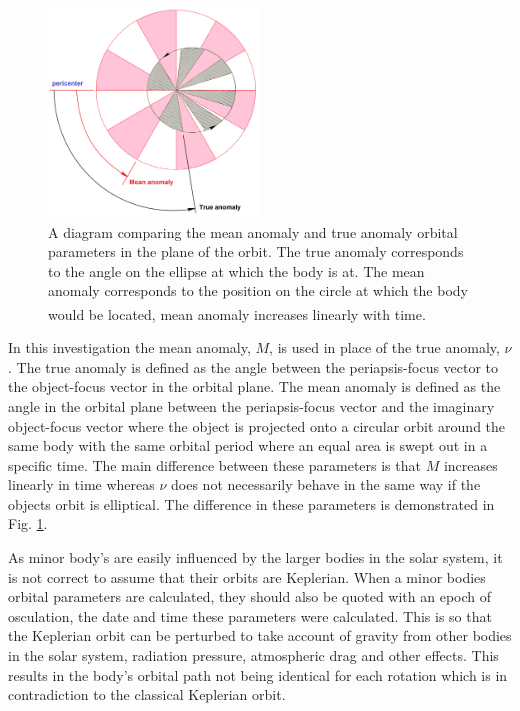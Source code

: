 \documentclass[10pt, twocolumn]{revtex4}    %
\newcommand{\scite}[1]{\textsuperscript{\cite{#1}}}
\begin{document}
\begin{figure}[h!]
\centering
\includegraphics[width=0.5\textwidth]{Mean_anomaly_diagram.png}
\caption{A diagram comparing the mean anomaly and true anomaly orbital parameters in the plane of the orbit. The true anomaly corresponds to the angle on the ellipse at which the body is at. The mean anomaly corresponds to the position on the circle at which the body would be located, mean anomaly increases linearly with time.\scite{Meananomalydiagram2015}}
\label{fig: mean-true anom}
\end{figure}

In this investigation the mean anomaly, $M$, is used in place of the true anomaly, $\nu$. The true anomaly is defined as the angle between the periapsis-focus vector to the object-focus vector in the orbital plane. The mean anomaly is defined as the angle in the orbital plane between the periapsis-focus vector and the imaginary object-focus vector where the object is projected onto a circular orbit around the same body with the same orbital period where an equal area is swept out in a specific time. The main difference between these parameters is that $M$ increases linearly in time whereas $\nu$ does not necessarily behave in the same way if the objects orbit is elliptical. The difference in these parameters is demonstrated in Fig. \ref{fig: mean-true anom}.

As minor body's are easily influenced by the larger bodies in the solar system, it is not correct to assume that their orbits are Keplerian. When a minor bodies orbital parameters are calculated, they should also be quoted with an epoch of osculation, the date and time these parameters were calculated. This is so that the Keplerian orbit can be perturbed to take account of gravity from other bodies in the solar system, radiation pressure, atmospheric drag and other effects. This results in the body's orbital path not being identical for each rotation which is in contradiction to the classical Keplerian orbit.
\end{document}
